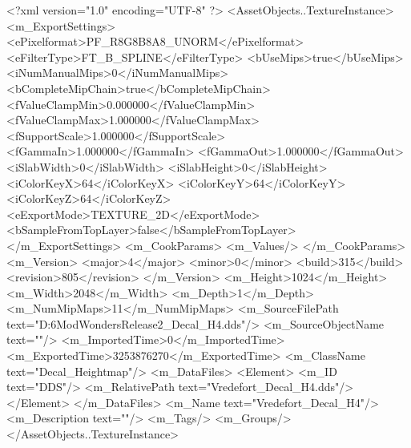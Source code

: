 <?xml version="1.0" encoding="UTF-8" ?>
<AssetObjects..TextureInstance>
	<m_ExportSettings>
		<ePixelformat>PF_R8G8B8A8_UNORM</ePixelformat>
		<eFilterType>FT_B_SPLINE</eFilterType>
		<bUseMips>true</bUseMips>
		<iNumManualMips>0</iNumManualMips>
		<bCompleteMipChain>true</bCompleteMipChain>
		<fValueClampMin>0.000000</fValueClampMin>
		<fValueClampMax>1.000000</fValueClampMax>
		<fSupportScale>1.000000</fSupportScale>
		<fGammaIn>1.000000</fGammaIn>
		<fGammaOut>1.000000</fGammaOut>
		<iSlabWidth>0</iSlabWidth>
		<iSlabHeight>0</iSlabHeight>
		<iColorKeyX>64</iColorKeyX>
		<iColorKeyY>64</iColorKeyY>
		<iColorKeyZ>64</iColorKeyZ>
		<eExportMode>TEXTURE_2D</eExportMode>
		<bSampleFromTopLayer>false</bSampleFromTopLayer>
	</m_ExportSettings>
	<m_CookParams>
		<m_Values/>
	</m_CookParams>
	<m_Version>
		<major>4</major>
		<minor>0</minor>
		<build>315</build>
		<revision>805</revision>
	</m_Version>
	<m_Height>1024</m_Height>
	<m_Width>2048</m_Width>
	<m_Depth>1</m_Depth>
	<m_NumMipMaps>11</m_NumMipMaps>
	<m_SourceFilePath text="D:\Civ6Mod\Terrain\NW\Natural Wonders\TM Release2\Vredefort\Vredefort_Decal_H4.dds"/>
	<m_SourceObjectName text=""/>
	<m_ImportedTime>0</m_ImportedTime>
	<m_ExportedTime>3253876270</m_ExportedTime>
	<m_ClassName text="Decal_Heightmap"/>
	<m_DataFiles>
		<Element>
			<m_ID text="DDS"/>
			<m_RelativePath text="Vredefort_Decal_H4.dds"/>
		</Element>
	</m_DataFiles>
	<m_Name text="Vredefort_Decal_H4"/>
	<m_Description text=""/>
	<m_Tags/>
	<m_Groups/>
</AssetObjects..TextureInstance>

